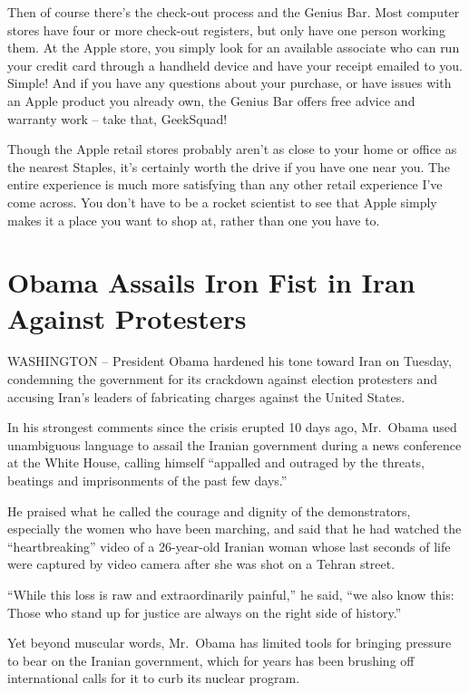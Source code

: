﻿\documentclass[12pt,a4paper,onecolumn]{article}
\begin{document}
Then of course there's the check-out process and the Genius Bar. Most computer stores have four or
more check-out registers, but only have one person working them. At the Apple store, you simply look
for an available associate who can run your credit card through a handheld device and have your
receipt emailed to you. Simple! And if you have any questions about your purchase, or have issues
with an Apple product you already own, the Genius Bar offers free advice and warranty work -- take
that, GeekSquad!

Though the Apple retail stores probably aren't as close to your home or office as the nearest
Staples, it's certainly worth the drive if you have one near you. The entire experience is much more
satisfying than any other retail experience I've come across. You don't have to be a rocket scientist to see that Apple simply makes it a place you want to shop at, rather than one you have to.

\section{Obama Assails Iron Fist in Iran Against Protesters}

WASHINGTON -- President Obama hardened his tone toward Iran on Tuesday, condemning the government
for its crackdown against election protesters and accusing Iran's leaders of fabricating charges
against the United States.

In his strongest comments since the crisis erupted 10 days ago, Mr.~Obama used unambiguous language
to assail the Iranian government during a news conference at the White House, calling himself
``appalled and outraged by the threats, beatings and imprisonments of the past few days.''

He praised what he called the courage and dignity of the demonstrators, especially the women who
have been marching, and said that he had watched the ``heartbreaking'' video of a 26-year-old
Iranian woman whose last seconds of life were captured by video camera after she was shot on a
Tehran street.

``While this loss is raw and extraordinarily painful,'' he said, ``we also know this: Those who
stand up for justice are always on the right side of history.''

Yet beyond muscular words, Mr.~Obama has limited tools for bringing pressure to bear on the Iranian
government, which for years has been brushing off international calls for it to curb its nuclear
program.
\end{document}
